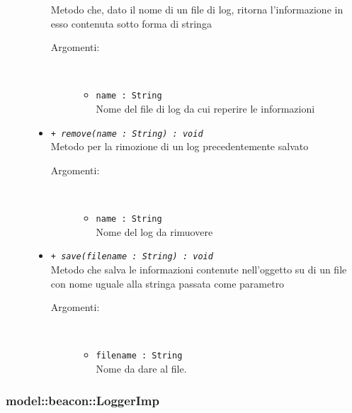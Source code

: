 \documentclass[../DefinizioneDiProdotto.tex]{subfiles}
\begin{document}
\begin{description}
\begin{itemize}
Metodo che, dato il nome di un file di log, ritorna l'informazione in esso contenuta sotto forma di stringa
 \begin{description}
\item[Argomenti:] \
\begin{itemize}
\item \texttt{name : String}\\
Nome del file di log da cui reperire le informazioni\end{itemize}
\end{description}
\item \texttt{+ \textit{remove(name : String) : void}}\\
Metodo per la rimozione di un log precedentemente salvato
 \begin{description}
\item[Argomenti:] \
\begin{itemize}
\item \texttt{name : String}\\
Nome del log da rimuovere\end{itemize}
\end{description}
\item \texttt{+ \textit{save(filename : String) : void}}\\
Metodo che salva le informazioni contenute nell'oggetto su di un file con nome uguale alla stringa passata come parametro
 \begin{description}
\item[Argomenti:] \
\begin{itemize}
\item \texttt{filename : String}\\
Nome da dare al file.\end{itemize}
\end{description}
\end{itemize}
\end{description}

\subsubsection{model::beacon::LoggerImp}
\end{document}

